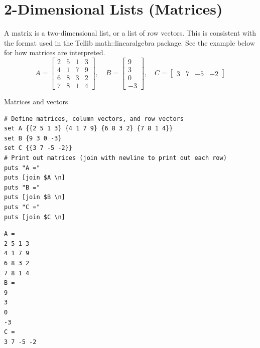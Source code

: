 \section{2-Dimensional Lists (Matrices)}
A matrix is a two-dimensional list, or a list of row vectors.
This is consistent with the format used in the Tcllib math::linearalgebra package.
See the example below for how matrices are interpreted.
\begin{equation*}\label{eq:matrix_AB}
A=\begin{bmatrix}
2 & 5 & 1 & 3 \\
4 & 1 & 7 & 9 \\
6 & 8 & 3 & 2 \\
7 & 8 & 1 & 4
\end{bmatrix},\quad
B=\begin{bmatrix}
9 \\ 3 \\ 0 \\ -3
\end{bmatrix},\quad
C = \begin{bmatrix}
3 & 7 & -5 & -2
\end{bmatrix}
\end{equation*}
\begin{example}{Matrices and vectors}
\begin{lstlisting}
# Define matrices, column vectors, and row vectors
set A {{2 5 1 3} {4 1 7 9} {6 8 3 2} {7 8 1 4}}
set B {9 3 0 -3}
set C {{3 7 -5 -2}}
# Print out matrices (join with newline to print out each row)
puts "A ="
puts [join $A \n]
puts "B ="
puts [join $B \n]
puts "C ="
puts [join $C \n]
\end{lstlisting}
\tcblower
\begin{lstlisting}
A =
2 5 1 3
4 1 7 9
6 8 3 2
7 8 1 4
B =
9
3
0
-3
C =
3 7 -5 -2
\end{lstlisting}
\end{example}

\clearpage
